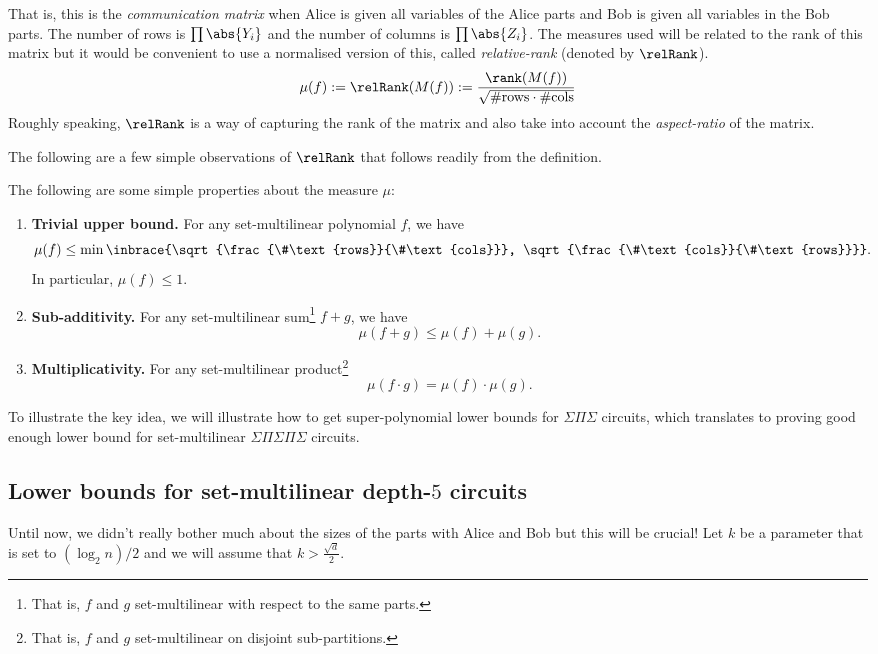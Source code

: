 That is, this is the \emph{communication matrix} when Alice is given all variables of the Alice parts and Bob is given all variables in the Bob parts. The number of rows is $\prod \abs{Y_i}$ and the number of columns is $\prod \abs{Z_i}$. The measures used will be related to the rank of this matrix but it would be convenient to use a normalised version of this, called \emph{relative-rank} (denoted by $\relRank$).
\[
  \mu(f) := \relRank(M(f)) := \frac{\rank(M(f))}{\sqrt{\#\text{rows} \cdot \#\text{cols}}}
\]
Roughly speaking, $\relRank$ is a way of capturing the rank of the matrix and also take into account the \emph{aspect-ratio} of the matrix.

The following are a few simple observations of $\relRank$ that follows readily from the definition.
\begin{observation}
  The following are some simple properties about the measure $\mu$:
  \begin{enumerate}
  \item \textbf{Trivial upper bound.} For any set-multilinear polynomial $f$, we have
    \[
      \mu(f) \leq \min\inbrace{\sqrt{\frac{\#\text{rows}}{\#\text{cols}}}, \sqrt{\frac{\#\text{cols}}{\#\text{rows}}}}. 
    \]
    In particular, $\mu(f) \leq 1$.
  \item \textbf{Sub-additivity.} For any set-multilinear sum\footnote{That is, $f$ and $g$ set-multilinear with respect to the same parts.} $f+g$, we have
    \[
      \mu(f+g) \leq \mu(f) + \mu(g).
    \]
  \item \textbf{Multiplicativity.} For any set-multilinear product\footnote{That is, $f$ and $g$ set-multilinear on disjoint sub-partitions.}
    \[
      \mu(f \cdot g) = \mu(f) \cdot \mu(g).
    \]
  \end{enumerate}
\end{observation}

To illustrate the key idea, we will illustrate how to get super-polynomial lower bounds for $\Sigma\Pi\Sigma$ circuits, which translates to proving good enough lower bound for set-multilinear $\Sigma\Pi\Sigma\Pi\Sigma$ circuits. 

\subsection{Lower bounds for set-multilinear depth-$5$ circuits}

Until now, we didn't really bother much about the sizes of the parts with Alice and Bob but this will be crucial! Let $k$ be a parameter that is set to $(\log_2 n)/2$ and we will assume that $k > \frac{\sqrt{d}}{2}$.

